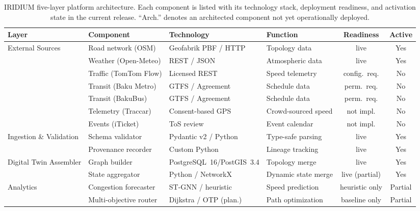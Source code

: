 \begin{table}[t]
\caption{IRIDIUM five-layer platform architecture. Each component is listed
         with its technology stack, deployment readiness, and activation
         state in the current release. ``Arch.'' denotes an architected
         component not yet operationally deployed.}
\label{tab:layers}
\centering
\renewcommand{\arraystretch}{1.20}
\begin{tabular}{@{}llllcc@{}}
\toprule
\textbf{Layer} &
\textbf{Component} &
\textbf{Technology} &
\textbf{Function} &
\textbf{Readiness} &
\textbf{Active} \\
\midrule
\multirow{7}{*}{External Sources}
  & Road network (OSM)          & Geofabrik PBF / HTTP & Topology data       & live              & Yes \\
  & Weather (Open-Meteo)        & REST / JSON          & Atmospheric data    & live              & Yes \\
  & Traffic (TomTom Flow)       & Licensed REST        & Speed telemetry     & config.\ req.     & No  \\
  & Transit (Baku Metro)        & GTFS / Agreement     & Schedule data       & perm.\ req.       & No  \\
  & Transit (BakuBus)           & GTFS / Agreement     & Schedule data       & perm.\ req.       & No  \\
  & Telemetry (Traccar)         & Consent-based GPS    & Crowd-sourced speed & not impl.         & No  \\
  & Events (iTicket)            & ToS review           & Event calendar      & not impl.         & No  \\
\midrule
\multirow{2}{*}{Ingestion \& Validation}
  & Schema validator            & Pydantic v2 / Python & Type-safe parsing   & live              & Yes \\
  & Provenance recorder         & Custom Python        & Lineage tracking    & live              & Yes \\
\midrule
\multirow{2}{*}{Digital Twin Assembler}
  & Graph builder               & PostgreSQL~16/PostGIS~3.4 & Topology merge & live              & Yes \\
  & State aggregator            & Python / NetworkX   & Dynamic state merge & live (partial)    & Yes \\
\midrule
\multirow{5}{*}{Analytics}
  & Congestion forecaster       & ST-GNN / heuristic  & Speed prediction    & heuristic only    & Partial \\
  & Multi-objective router      & Dijkstra / OTP (plan.) & Path optimization & baseline only     & Partial \\

\end{tabular}
\end{table}

